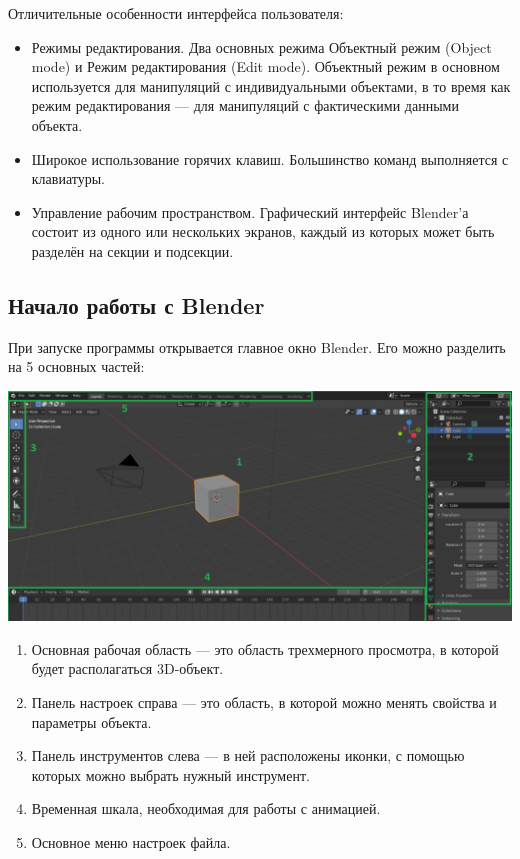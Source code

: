 \documentclass[12pt]{article}
\begin{document}
Отличительные особенности интерфейса пользователя:


\begin{itemize}
\item Режимы редактирования. Два основных режима Объектный режим (Object mode) и Режим редактирования (Edit mode). Объектный режим в основном используется для манипуляций с индивидуальными объектами, в то время как режим редактирования — для манипуляций с фактическими данными объекта.

\item Широкое использование горячих клавиш. Большинство команд выполняется с клавиатуры. 

\item Управление рабочим пространством. Графический интерфейс Blender’а состоит из одного или нескольких экранов, каждый из которых может быть разделён на секции и подсекции.
\end{itemize}


\subsection{Начало работы с Blender}

При запуске программы открывается главное окно   Blender. Его можно разделить на 5 основных частей:

\vskip 1cm
{
    \centering
    \includegraphics[width=1\linewidth]{гокно.png}
    \label{fig:i1}
}
\vskip 1cm


\begin{enumerate}
\item Основная рабочая область — это область трехмерного просмотра, в которой будет располагаться 3D-объект.
\item Панель настроек справа — это область, в которой можно менять свойства и параметры объекта.
\item Панель инструментов слева — в ней расположены иконки, с помощью которых можно выбрать нужный инструмент.
\item Временная шкала, необходимая для работы с анимацией.
\item Основное меню настроек файла.
\end{enumerate}
\end{document}
